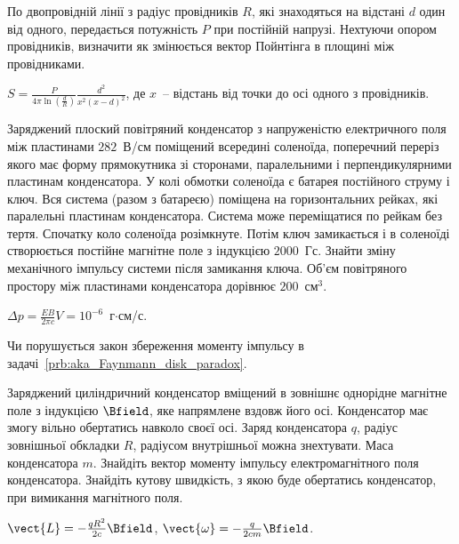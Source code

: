 \begin{problem}
    По двопровідній лінії з радіус провідників $R$, які знаходяться на відстані $d$ один від одного, передається потужність $P$ при постійній напрузі. Нехтуючи опором провідників, визначити як змінюється вектор Пойнтінга в площині між провідниками.
\begin{solution}
	$S  = \frac{P}{4\pi\ln\left( \frac{d}{R} \right) } \frac{d^2}{x^2\left( x - d\right)^2 }$, де $x$~-- відстань від точки до осі одного з провідників.
\end{solution}
\end{problem}


\begin{problem}\label{prb:KRS3.191}
Заряджений плоский повітряний конденсатор з напруженістю електричного поля між пластинами $282$~В/см поміщений всередині соленоїда, поперечний переріз якого має форму прямокутника зі сторонами, паралельними і перпендикулярними пластинам конденсатора. У колі обмотки соленоїда є батарея постійного струму і ключ. Вся система (разом з батареєю) поміщена на горизонтальних рейках, які паралельні пластинам конденсатора. Система може переміщатися по рейкам без тертя. Спочатку коло соленоїда розімкнуте. Потім ключ замикається і в соленоїді створюється постійне магнітне поле з індукцією $2000$~Гс. Знайти зміну механічного імпульсу системи після замикання ключа. Об'єм повітряного простору між пластинами конденсатора дорівнює $200$~см$^3$.
\begin{solution}
	$\Delta p = \frac{EB}{2\pi c}V = 10^{-6}$~г$\cdot$см/с.
\end{solution}
\end{problem}


\begin{problem}
    Чи порушується закон збереження моменту імпульсу в задачі~\ref{prb:aka_Faynmann_disk_paradox}.
\end{problem}


\begin{problem}%
    Заряджений циліндричний конденсатор вміщений в зовнішнє однорідне магнітне поле з індукцією $ \Bfield $, яке напрямлене вздовж його осі. Конденсатор має змогу вільно обертатись навколо своєї осі. Заряд конденсатора $ q $, радіус зовнішньої обкладки $ R $, радіусом внутрішньої можна знехтувати.  Маса конденсатора $ m $. Знайдіть вектор моменту імпульсу електромагнітного поля конденсатора. Знайдіть кутову швидкість, з якою буде обертатись конденсатор, при вимикання магнітного поля.
\begin{solution}
    $ \vect{L} =  -\frac{q R^2}{2c}\Bfield $, $ \vect{\omega} = -\frac{q}{2c m}\Bfield $.
\end{solution}
\end{problem}



